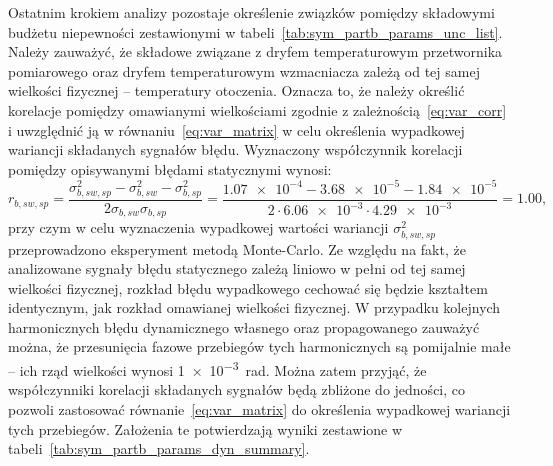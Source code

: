 Ostatnim krokiem analizy pozostaje określenie związków pomiędzy składowymi budżetu niepewności zestawionymi w tabeli~\ref{tab:sym_partb_params_unc_list}. Należy zauważyć, że składowe związane z dryfem temperaturowym przetwornika pomiarowego oraz dryfem temperaturowym wzmacniacza zależą od tej samej wielkości fizycznej -- temperatury otoczenia. Oznacza to, że należy określić korelacje pomiędzy omawianymi wielkościami zgodnie z zależnością~\eqref{eq:var_corr} i uwzględnić ją w równaniu~\eqref{eq:var_matrix} w celu określenia wypadkowej wariancji składanych sygnałów błędu. Wyznaczony współczynnik korelacji pomiędzy opisywanymi błędami statycznymi wynosi:
\begin{equation}
r_{b,sw,sp} = \frac{\sigma_{b,sw,sp}^{2} - \sigma_{b,sw}^{2} - \sigma_{b,sp}^{2}}{2 \sigma_{b,sw} \sigma_{b,sp}} = \frac{\num{1.07e-4} - \num{3.68e-5} - \num{1.84e-5}}{2 \cdot \num{6.06e-3} \cdot \num{4.29e-3}} = 1.00 \label{eq:sym_partb_stat_corr},
\end{equation}
przy czym w celu wyznaczenia wypadkowej wartości wariancji $\sigma_{b,sw,sp}^{2}$ przeprowadzono eksperyment metodą Monte-Carlo. Ze względu na fakt, że analizowane sygnały błędu statycznego zależą liniowo w pełni od tej samej wielkości fizycznej, rozkład błędu wypadkowego cechować się będzie kształtem identycznym, jak rozkład omawianej wielkości fizycznej. W przypadku kolejnych harmonicznych błędu dynamicznego własnego oraz propagowanego zauważyć można, że przesunięcia fazowe przebiegów tych harmonicznych są pomijalnie małe -- ich rząd wielkości wynosi \qty{1e-3}{rad}. Można zatem przyjąć, że współczynniki korelacji składanych sygnałów będą zbliżone do jedności, co pozwoli zastosować równanie~\eqref{eq:var_matrix} do określenia wypadkowej wariancji tych przebiegów. Założenia te potwierdzają wyniki zestawione w tabeli~\ref{tab:sym_partb_params_dyn_summary}.

